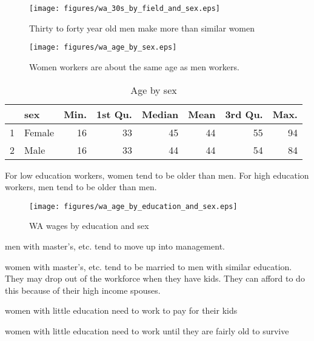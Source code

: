 \documentclass{exam}
\begin{document}
  \begin{figure}[H]
    \centering
    \texttt{[image: figures/wa\_30s\_by\_field\_and\_sex.eps]}
    \caption{ Thirty to forty year old men make more than similar women }
  \end{figure}

  \begin{figure}[H]
    \centering
    \texttt{[image: figures/wa\_age\_by\_sex.eps]}
    \caption{Women workers are about the same age as men workers.}
  \end{figure}

  \begin{table}[ht]
    \centering
    \begin{tabular}{rlrrrrrr}
      \toprule
        & sex    & Min. & 1st Qu. & Median & Mean & 3rd Qu. & Max. \\
      \midrule
      1 & Female & 16   & 33      & 45     & 44   & 55      & 94 \\
      2 & Male   & 16   & 33      & 44     & 44   & 54      & 84 \\
      \bottomrule
    \end{tabular}
    \caption{Age by sex}
  \end{table}

  For low education workers, women tend to be older than men.  For high education workers, men
  tend to be older than men.  

  \begin{figure}[H]
    \centering
    \texttt{[image: figures/wa\_age\_by\_education\_and\_sex.eps]}
    \caption{WA wages by education and sex}
  \end{figure}

  \begin{itemize*}
    \item men with master's, etc. tend to move up into management. 

    \item women with master's, etc. tend to be married to men with similar education.  They may
      drop out of the workforce when they have kids.  They can afford to do this because of their
      high income spouses.

    \item women with little education need to work to pay for their kids

    \item women with little education need to work until they are fairly old to survive

  \end{itemize*}
\end{document}
